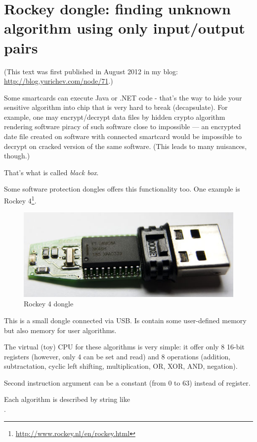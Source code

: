 ﻿\section{Rockey dongle: finding unknown algorithm using only input/output pairs}

(This text was first published in August 2012 in my blog: \url{http://blog.yurichev.com/node/71}.)

Some smartcards can execute Java or .NET code - that's the way to hide your sensitive algorithm
into chip that is very hard to break (decapsulate).
For example, one may encrypt/decrypt data files by hidden crypto algorithm rendering software
piracy of such software close to impossible --- an encrypted date file created on software with connected smartcard
would be impossible to decrypt on cracked version of the same software.
(This leads to many nuisances, though.)

That's what is called \emph{black box}.

Some software protection dongles offers this functionality too.
One example is Rockey 4\footnote{\url{http://www.rockey.nl/en/rockey.html}}.

\begin{figure}[H]
\centering
\includegraphics[scale=2]{pgm_synth/rockey/rockey_4.jpg}
\caption{Rockey 4 dongle}
\end{figure}

This is a small dongle connected via USB. Is contain some user-defined memory but also memory for user algorithms.

The virtual (toy) CPU for these algorithms is very simple: it offer only 8 16-bit registers
(however, only 4 can be set and read) and 8 operations
(addition, subtractation, cyclic left shifting, multiplication, OR, XOR, AND, negation).

Second instruction argument can be a constant (from 0 to 63) instead of register.

Each algorithm is described by string like \\
.

